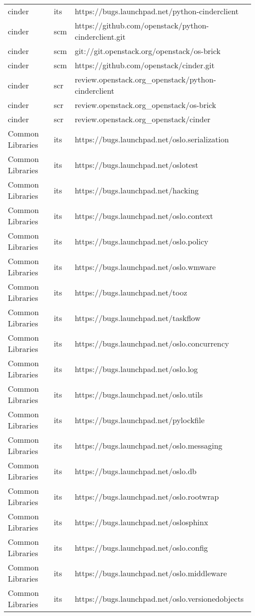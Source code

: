 \begin{center}
\begin{longtable}{|p{4cm}|p{1cm}|p{10cm}|}
cinder&its&https://bugs.launchpad.net/python-cinderclient\\ 
cinder&scm&https://github.com/openstack/python-cinderclient.git\\ 
cinder&scm&git://git.openstack.org/openstack/os-brick\\ 
cinder&scm&https://github.com/openstack/cinder.git\\ 
cinder&scr&review.openstack.org\_openstack/python-cinderclient\\ 
cinder&scr&review.openstack.org\_openstack/os-brick\\ 
cinder&scr&review.openstack.org\_openstack/cinder\\ 
Common Libraries&its&https://bugs.launchpad.net/oslo.serialization\\ 
Common Libraries&its&https://bugs.launchpad.net/oslotest\\ 
Common Libraries&its&https://bugs.launchpad.net/hacking\\ 
Common Libraries&its&https://bugs.launchpad.net/oslo.context\\ 
Common Libraries&its&https://bugs.launchpad.net/oslo.policy\\ 
Common Libraries&its&https://bugs.launchpad.net/oslo.wmware\\ 
Common Libraries&its&https://bugs.launchpad.net/tooz\\ 
Common Libraries&its&https://bugs.launchpad.net/taskflow\\ 
Common Libraries&its&https://bugs.launchpad.net/oslo.concurrency\\ 
Common Libraries&its&https://bugs.launchpad.net/oslo.log\\ 
Common Libraries&its&https://bugs.launchpad.net/oslo.utils\\ 
Common Libraries&its&https://bugs.launchpad.net/pylockfile\\ 
Common Libraries&its&https://bugs.launchpad.net/oslo.messaging\\ 
Common Libraries&its&https://bugs.launchpad.net/oslo.db\\ 
Common Libraries&its&https://bugs.launchpad.net/oslo.rootwrap\\ 
Common Libraries&its&https://bugs.launchpad.net/oslosphinx\\ 
Common Libraries&its&https://bugs.launchpad.net/oslo.config\\ 
Common Libraries&its&https://bugs.launchpad.net/oslo.middleware\\ 
Common Libraries&its&https://bugs.launchpad.net/oslo.versionedobjects\\ 

\end{longtable}
\end{center}
